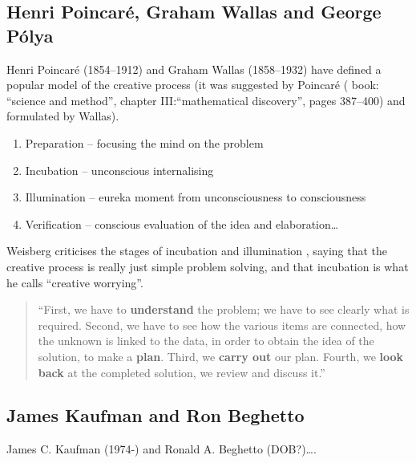 \subsection{Henri Poincaré, Graham Wallas and George Pólya}

Henri Poincaré (1854--1912) \autocite{Poincare2001} and Graham Wallas (1858--1932) \autocite{Wallas1926} have defined a popular model \autocite{Boden2003, Koestler1964, Partridge1994} of the creative process (it was suggested by Poincaré  (\autocite{Poincare2001} book: ``science and method'', chapter III:\@``mathematical discovery'', pages 387--400) and formulated by Wallas).


\begin{enumerate}
  \item Preparation – focusing the mind on the problem
  \item Incubation – unconscious internalising
  \item Illumination – eureka moment from unconsciousness to consciousness
  \item Verification – conscious evaluation of the idea and elaboration…
\end{enumerate}

Weisberg criticises the stages of incubation and illumination \autocite[referred to by][]{Partridge1994}, saying that the creative process is really just simple problem solving, and that incubation is what he calls ``creative worrying''.

\begin{quote}
  ``First, we have to \textbf{understand} the problem; we have to see clearly what is required. Second, we have to see how the various items are connected, how the unknown is linked to the data, in order to obtain the idea of the solution, to make a \textbf{plan}. Third, we \textbf{carry out} our plan. Fourth, we \textbf{look back} at the completed solution, we review and discuss it.'' \autocite[p.5-6, his emphasis]{Polya1957}
\end{quote}


\subsection{James Kaufman and Ron Beghetto}

James C. Kaufman (1974-) and Ronald A. Beghetto (DOB?)\ldots\autocite[See][]{Kaufman2009}.

